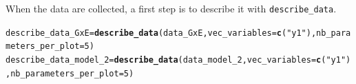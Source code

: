 \documentclass{book}\usepackage[]{graphicx}\usepackage[]{color}
\makeatletter
\newcommand{\hlnum}[1]{\textcolor[rgb]{0.686,0.059,0.569}{#1}}%
\newcommand{\hlstr}[1]{\textcolor[rgb]{0.192,0.494,0.8}{#1}}%
\newcommand{\hlstd}[1]{\textcolor[rgb]{0.345,0.345,0.345}{#1}}%
\newcommand{\hlkwb}[1]{\textcolor[rgb]{0.69,0.353,0.396}{#1}}%
\newcommand{\hlkwc}[1]{\textcolor[rgb]{0.333,0.667,0.333}{#1}}%
\newcommand{\hlkwd}[1]{\textcolor[rgb]{0.737,0.353,0.396}{\textbf{#1}}}%
\newenvironment{kframe}{%
 \def\at@end@of@kframe{}%
 \ifinner\ifhmode%
  \def\at@end@of@kframe{\end{minipage}}%
  \begin{minipage}{\columnwidth}%
 \fi\fi%
 \def\FrameCommand##1{\hskip\@totalleftmargin \hskip-\fboxsep
 \colorbox{shadecolor}{##1}\hskip-\fboxsep
     \hskip-\linewidth \hskip-\@totalleftmargin \hskip\columnwidth}%
 \MakeFramed {\advance\hsize-\width
   \@totalleftmargin\z@ \linewidth\hsize
   \@setminipage}}%
 {\par\unskip\endMakeFramed%
 \at@end@of@kframe}
\newenvironment{knitrout}{}{} %
\makeatother
\begin{document}
When the data are collected, a first step is to describe it with \texttt{describe\_data}.

\begin{knitrout}
\color{fgcolor}\begin{kframe}
\begin{alltt}
\hlstd{describe_data_GxE} \hlkwb{=} \hlkwd{describe_data}\hlstd{(data_GxE,} \hlkwc{vec_variables} \hlstd{=} \hlkwd{c}\hlstd{(}\hlstr{"y1"}\hlstd{),} \hlkwc{nb_parameters_per_plot} \hlstd{=} \hlnum{5}\hlstd{)}
\hlstd{describe_data_model_2} \hlkwb{=} \hlkwd{describe_data}\hlstd{(data_model_2,} \hlkwc{vec_variables} \hlstd{=} \hlkwd{c}\hlstd{(}\hlstr{"y1"}\hlstd{),} \hlkwc{nb_parameters_per_plot} \hlstd{=} \hlnum{5}\hlstd{)}
\end{alltt}
\end{kframe}
\end{knitrout}
\end{document}

